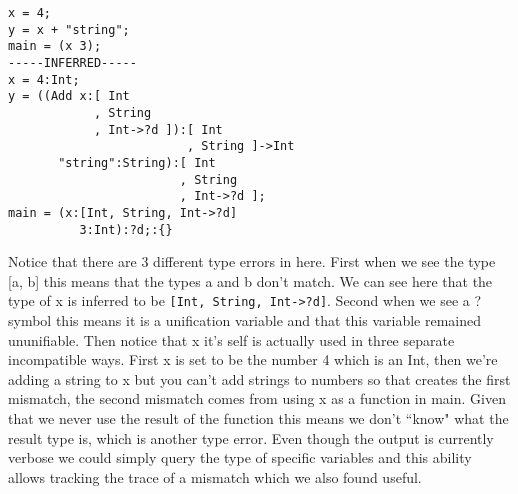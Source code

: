 \begin{verbatim}
x = 4;
y = x + "string";
main = (x 3);
-----INFERRED-----
x = 4:Int;
y = ((Add x:[ Int
            , String
            , Int->?d ]):[ Int
                         , String ]->Int
       "string":String):[ Int
                        , String
                        , Int->?d ];
main = (x:[Int, String, Int->?d]
          3:Int):?d;:{}
\end{verbatim}
Notice that there are 3 different type errors in here. First when we see the type [a, b] this means that the types a and b don't match. We can see here that the type of x is inferred to be \texttt{[Int, String, Int->?d]}. Second when we see a ? symbol this means it is a unification variable and that this variable remained ununifiable. Then notice that x it's self is actually used in three separate incompatible ways. First x is set to be the number 4 which is an Int, then we're adding a string to x but you can't add strings to numbers so that creates the first mismatch, the second mismatch comes from using x as a function in main. Given that we never use the result of the function this means we don't ``know" what the result type is, which is another type error. Even though the output is currently verbose we could simply query the type of specific variables and this ability allows tracking the trace of a mismatch which we also found useful.
